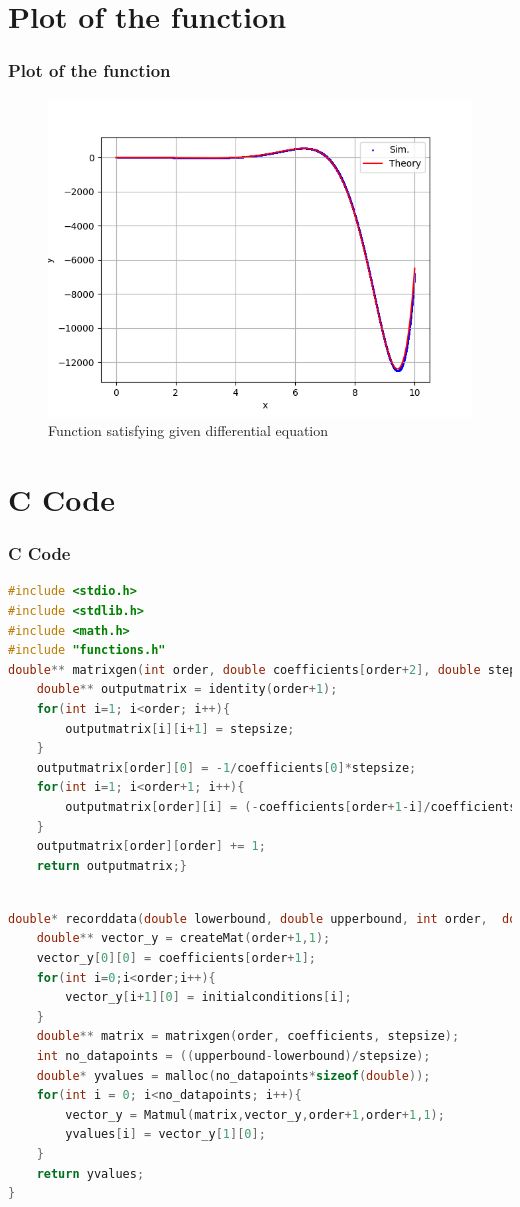 \documentclass{beamer}
\theoremstyle{remark}
\numberwithin{equation}{section}
\begin{document}
\section{Plot of the function}
\begin{frame}
\frametitle{Plot of the function}
\begin{figure}[H]
    \centering
	\includegraphics[width=0.8\columnwidth]{figs/fig.png}
    \caption{Function satisfying given differential equation}
    \end{figure}   
\end{frame}
\section{C Code}
\begin{frame}[fragile]
\frametitle{C Code}
\begin{lstlisting}[language=C]
#include <stdio.h>
#include <stdlib.h>
#include <math.h>
#include "functions.h"
double** matrixgen(int order, double coefficients[order+2], double stepsize){
	double** outputmatrix = identity(order+1);
	for(int i=1; i<order; i++){
		outputmatrix[i][i+1] = stepsize;
	}
	outputmatrix[order][0] = -1/coefficients[0]*stepsize;
	for(int i=1; i<order+1; i++){
		outputmatrix[order][i] = (-coefficients[order+1-i]/coefficients[0])*stepsize;
	}
	outputmatrix[order][order] += 1; 
	return outputmatrix;}

\end{lstlisting}
\end{frame}
\begin{frame}[fragile]
\begin{lstlisting}[language=C]

double* recorddata(double lowerbound, double upperbound, int order,  double coefficients[order+2], double initialconditions[order], double stepsize){
	double** vector_y = createMat(order+1,1);
	vector_y[0][0] = coefficients[order+1];
	for(int i=0;i<order;i++){
		vector_y[i+1][0] = initialconditions[i];
	}
	double** matrix = matrixgen(order, coefficients, stepsize);
	int no_datapoints = ((upperbound-lowerbound)/stepsize);
	double* yvalues = malloc(no_datapoints*sizeof(double));
	for(int i = 0; i<no_datapoints; i++){
		vector_y = Matmul(matrix,vector_y,order+1,order+1,1);
		yvalues[i] = vector_y[1][0];
	}
	return yvalues;
}


\end{lstlisting}
\end{frame}
\end{document}
